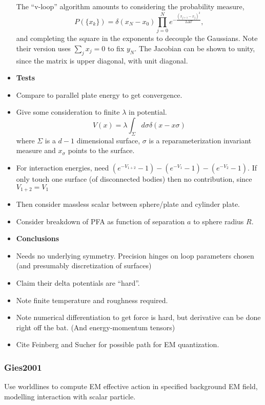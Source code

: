 \begin{itemize}
The ``v-loop'' algorithm amounts to considering the probability measure,
\begin{equation}
P(\{x_k\}) =  \delta(x_N-x_0)\prod_{j=0}^{N}e^{-\frac{(x_{j+1}-x_j)^2}{2\Delta T}},
\end{equation}
and completing the square in the exponents to decouple the Gaussians.  
Note their version uses $\sum_{j}x_j=0$ to fix $y_N$.  
The Jacobian can be shown to unity, since the matrix is upper diagonal, with unit diagonal.  
\item \textbf{Tests}
\item Compare to parallel plate energy to get convergence. 
\item Give some consideration to finite $\lambda$ in potential.  
\begin{equation}
V(x) = \lambda\int_{\Sigma}d\sigma \delta(x-x\sigma)
\end{equation}
where $\Sigma$ is a $d-1$ dimensional surface, $\sigma$ is a reparameterization invariant measure and $x_\sigma$ points to the surface.  
\item For interaction energies, need $(e^{-V_{1+2}} - 1) -  (e^{-V_1}-1) - (e^{-V_{2}}-1)$.  If only touch one surface (of disconnected bodies) then 
no contribution, since $V_{1+2}=V_1$
\item Then consider massless scalar between sphere/plate and cylinder plate.  
\item Consider breakdown of PFA as function of separation $a$ to sphere radius $R$.  
\item \textbf{Conclusions}
\item Needs no underlying symmetry.  Precision hinges on loop parameters chosen (and presumably discretization of surfaces)
\item Claim their delta potentials are ``hard''.
\item Note finite temperature and roughness required.  
\item Note numerical differentiation to get force is hard, but derivative can be done right off the bat.  (And energy-momentum tensors)
\item Cite Feinberg and Sucher for possible path for EM quantization.  
\end{itemize}

\subsubsection{Gies2001}
\cite{Gies2001}

Use worldlines to compute EM effective action in specified background EM field, modelling interaction with scalar particle.  

